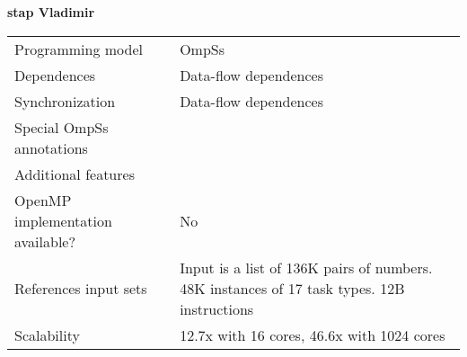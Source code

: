 \section*{}
\label{stap_vladimir}
\centering
\Huge
\textbf{stap Vladimir}

\begin{table}[h!]
  \large
  \centering
  \begin{tabular}{|l|l|}
    \hline
    Programming model                & OmpSs \\
    Dependences                      & Data-flow dependences \\
    Synchronization                  & Data-flow dependences \\
    Special OmpSs annotations        &  \\
    Additional features              &  \\
    OpenMP implementation available? & No \\
    References input sets            & Input is a list of 136K pairs of numbers. 48K instances of 17 task types. 12B instructions \\
    Scalability                      & 12.7x with 16 cores, 46.6x with 1024 cores \\
    \hline
  \end{tabular}
\end{table}

\newpage
